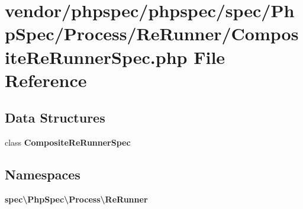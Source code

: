 \section{vendor/phpspec/phpspec/spec/\+Php\+Spec/\+Process/\+Re\+Runner/\+Composite\+Re\+Runner\+Spec.php File Reference}
\label{_composite_re_runner_spec_8php}
\subsection*{Data Structures}
\begin{DoxyCompactItemize}
\item 
class {\bf Composite\+Re\+Runner\+Spec}
\end{DoxyCompactItemize}
\subsection*{Namespaces}
\begin{DoxyCompactItemize}
\item 
 {\bf spec\textbackslash{}\+Php\+Spec\textbackslash{}\+Process\textbackslash{}\+Re\+Runner}
\end{DoxyCompactItemize}
